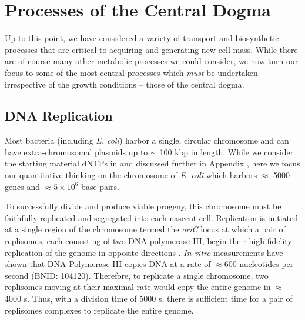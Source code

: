 \section{Processes of the Central Dogma}
Up to this point, we have considered a variety of transport and biosynthetic
processes that are critical to acquiring and generating new cell mass. While
there are of course many other metabolic processes we could consider, we now
turn our focus to some of the most central processes which \textit{must} be
undertaken irrespective of the growth conditions -- those of the central
dogma.

\subsection{DNA Replication}
Most bacteria (including \textit{E. coli}) harbor a single, circular chromosome
and can have extra-chromosomal plasmids up to $\sim$ 100 kbp in length. While
we consider the starting material dNTPs in  and
discussed further in Appendix , here we focus
our quantitative thinking on the chromosome of \textit{E. coli} which
harbors $\approx$ 5000 genes and $\approx 5\times 10^6$ base pairs. 


To successfully divide and produce viable progeny, this chromosome must be
faithfully replicated and segregated into each nascent cell. Replication is
initiated at a single region of the chromosome termed the \textit{oriC} locus
at which a pair of replisomes, each consisting of two DNA polymerase III,
begin their high-fidelity replication of the genome in opposite directions
\citep{fijalkowska2012}. \textit{In vitro} measurements have shown that DNA
Polymerase III copies DNA at a rate of $\approx 600$ nucleotides per second
(BNID: 104120). Therefore, to replicate a single chromosome, two replisomes
moving at their maximal rate would copy the entire genome in $\approx$ 4000
s. Thus, with a division time of 5000 s, there is sufficient time for a pair
of replisomes complexes to replicate the entire genome.


